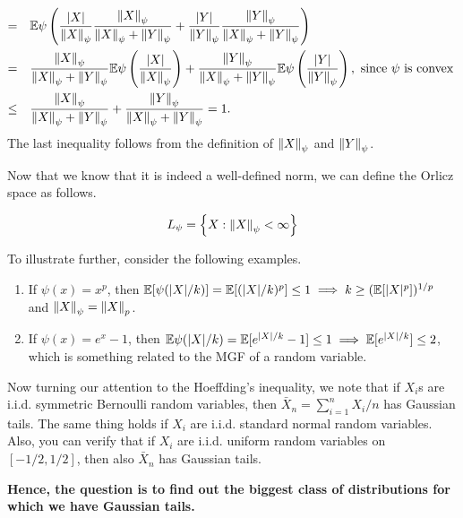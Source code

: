 \documentclass[12pt]{article}
\begin{document}
\begin{enumerate}
\begin{align*}
              = \quad    & \mathbb{E}\psi\left( \dfrac{\left\lvert X \right\rvert}{\left\Vert X \right\Vert_\psi} \dfrac{\left\Vert X \right\Vert_\psi}{\left\Vert X \right\Vert_\psi + \left\Vert Y \right\Vert_\psi} + \dfrac{\left\lvert Y \right\rvert}{\left\Vert Y \right\Vert_\psi} \dfrac{\left\Vert Y \right\Vert_\psi}{\left\Vert X \right\Vert_\psi + \left\Vert Y \right\Vert_\psi} \right)                                                              \\
              = \quad    & \dfrac{\left\Vert X \right\Vert_\psi}{\left\Vert X \right\Vert_\psi + \left\Vert Y \right\Vert_\psi} \mathbb{E}\psi\left( \dfrac{\left\lvert X \right\rvert}{\left\Vert X \right\Vert_\psi} \right) + \dfrac{\left\Vert Y \right\Vert_\psi}{\left\Vert X \right\Vert_\psi + \left\Vert Y \right\Vert_\psi} \mathbb{E}\psi\left( \dfrac{\left\lvert Y \right\rvert}{\left\Vert Y \right\Vert_\psi} \right), \text{ since } \psi \text{ is convex } \\
              \leq \quad & \dfrac{\left\Vert X \right\Vert_\psi}{\left\Vert X \right\Vert_\psi + \left\Vert Y \right\Vert_\psi} + \dfrac{\left\Vert Y \right\Vert_\psi}{\left\Vert X \right\Vert_\psi + \left\Vert Y \right\Vert_\psi} = 1.
          \end{align*}
          \noindent The last inequality follows from the definition of $\left\Vert X \right\Vert_\psi$ and $\left\Vert Y \right\Vert_\psi$.
\end{enumerate}

Now that we know that it is indeed a well-defined norm, we can define the Orlicz space as follows.

\begin{equation*}
    L_\psi = \left\{ X: \left\Vert X \right\Vert_\psi < \infty \right\}
\end{equation*}

To illustrate further, consider the following examples.

\begin{enumerate}
    \item If $\psi(x) = x^p$, then $\mathbb{E}[\psi(|X|/k)] = \mathbb{E}[(|X|/k)^p] \leq 1 \implies k \geq (\mathbb{E}[|X|^p])^{1/p}$ and $\left\Vert X \right\Vert_\psi = \left\Vert X \right\Vert_p$.
    \item If $\psi(x) = e^x - 1$, then $\mathbb{E}\psi(|X|/k) = \mathbb{E}[e^{|X|/k} - 1] \leq 1 \implies \mathbb{E}[e^{\left\lvert X \right\rvert/k}] \leq 2$, which is something related to the MGF of a random variable.
\end{enumerate}

Now turning our attention to the Hoeffding's inequality, we note that if $X_i$s are i.i.d. symmetric Bernoulli random variables, then $\bar{X}_n = \sum_{i=1}^n X_i / n$ has Gaussian tails. The same thing holds if $X_i$ are i.i.d. standard normal random variables. Also, you can verify that if $X_i$ are i.i.d. uniform random variables on $[-1/2,1/2]$, then also $\bar{X}_n$ has Gaussian tails.

\textbf{Hence, the question is to find out the biggest class of distributions for which we have Gaussian tails.}
\end{document}
